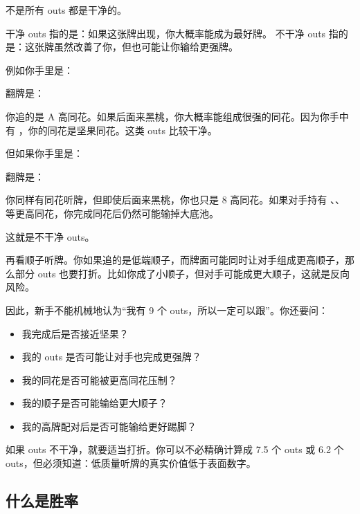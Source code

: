 不是所有 outs 都是干净的。

干净 outs 指的是：如果这张牌出现，你大概率能成为最好牌。
不干净 outs 指的是：这张牌虽然改善了你，但也可能让你输给更强牌。

例如你手里是：

\begin{center}
\end{center}

翻牌是：

\begin{center}
\end{center}

你追的是 A 高同花。如果后面来黑桃，你大概率能组成很强的同花。因为你手中有 ，你的同花是坚果同花。这类 outs 比较干净。

但如果你手里是：

\begin{center}
\end{center}

翻牌是：

\begin{center}
\end{center}

你同样有同花听牌，但即使后面来黑桃，你也只是 8 高同花。如果对手持有 、、 等更高同花，你完成同花后仍然可能输掉大底池。

这就是不干净 outs。

再看顺子听牌。你如果追的是低端顺子，而牌面可能同时让对手组成更高顺子，那么部分 outs 也要打折。比如你成了小顺子，但对手可能成更大顺子，这就是反向风险。

因此，新手不能机械地认为“我有 9 个 outs，所以一定可以跟”。你还要问：

\begin{itemize}
\item 我完成后是否接近坚果？
\item 我的 outs 是否可能让对手也完成更强牌？
\item 我的同花是否可能被更高同花压制？
\item 我的顺子是否可能输给更大顺子？
\item 我的高牌配对后是否可能输给更好踢脚？
\end{itemize}

如果 outs 不干净，就要适当打折。你可以不必精确计算成 7.5 个 outs 或 6.2 个 outs，但必须知道：低质量听牌的真实价值低于表面数字。

\subsection{什么是胜率}

